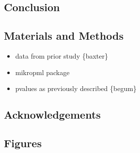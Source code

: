 \documentclass[
]{article}
\providecommand{\tightlist}{%
  \setlength{\itemsep}{0pt}\setlength{\parskip}{0pt}}
\begin{document}
\newpage

\hypertarget{conclusion}{%
\subsection{Conclusion}\label{conclusion}}

\newpage

\hypertarget{materials-and-methods}{%
\subsection{Materials and Methods}\label{materials-and-methods}}

\begin{itemize}
\tightlist
\item
  data from prior study \{baxter\}
\item
  mikropml package
\item
  pvalues as previously described \{begum\}
\end{itemize}

\newpage

\hypertarget{acknowledgements}{%
\subsection{Acknowledgements}\label{acknowledgements}}

\newpage

\hypertarget{figures}{%
\subsection{Figures}\label{figures}}
\end{document}
